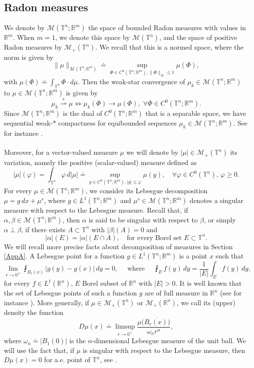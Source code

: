 \documentclass[10pt,reqno]{amsart}
\numberwithin{equation}{section}
\newcommand{\weak}{\overset{*}{\rightharpoonup}}
\newcommand{\R}{\mathbb{R}}
\newcommand{\T}{\mathbb{T}}
\theoremstyle{plain}
\theoremstyle{definition}
\theoremstyle{remark}
\begin{document}
\subsection{Radon measures}

We denote by $\mathcal{M}(\T^n;\R^m)$ the space of bounded Radon measures with values in $\R^m$. When $m =1$, we denote this space by $\mathcal{M}(\T^n)$, and the space of positive Radon measures by $\mathcal{M}_+(\T^n)$. We recall that this is a normed space, where the norm is given by
 $$\|\mu\|_{\mathcal{M}(\T^n;\R^m)} \doteq \sup_{\Phi \in C^0(\T^n;\R^m),\|\Phi\|_{\infty}\le 1}\mu(\Phi),
 $$
with $\mu(\Phi)\doteq \int_{\T^n} \Phi\cdot d\mu $. Then the weak-star convergence of $\mu_k \in \mathcal{M}(\T^n;\R^m)$ to $\mu \in \mathcal{M}(\T^n;\R^m)$ is given by
\[
\mu_k \weak \mu  \Leftrightarrow \mu_k(\Phi) \to \mu(\Phi), \, \, \forall \Phi \in C^0(\T^n;\R^m).
\]
Since $\mathcal{M}(\T^n;\R^m)$ is the dual of $C^0(\T^n;\R^m)$ that is a separable space, we have sequential weak-$*$ compactness for equibounded sequences $\mu_k \in \mathcal{M}(\T^n;\R^m)$. See for instance \cite[Sec. 1.9]{EVG}.
\\
\\
Moreover, for a vector-valued measure $\mu$ we will denote by $|\mu|\in \mathcal{M}_+(\T^n)$ its variation, namely the positive (scalar-valued) measure defined as
$$
|\mu|(\varphi)=\int_{\T^n} \varphi \,d|\mu| \doteq \sup_{g \in C^0(\T^n;\R^m),|g|\le \varphi}\mu(g),\quad \forall \varphi\in C^0(\T^n), \, \varphi \geq 0.
$$
For every $\mu \in \mathcal{M}(\T^n;\R^m)$, we consider its Lebesgue decomposition $\mu = g\,dx + \mu^s$, where $g \in L^1(\T^n;\R^m)$ and $\mu^s \in \mathcal{M}(\T^n;\R^m)$ denotes a singular measure with respect to the Lebesgue measure. Recall that, if $\alpha,\beta \in \mathcal{M}(\T^n;\R^m)$, then $\alpha$ is said to be singular with respect to $\beta$, or simply $\alpha \perp \beta$, if there exists $A \subset \T^n$ with $|\beta|(A) = 0$ and
\[
|\alpha|(E) = |\alpha|(E\cap A), \quad  \text{for every Borel set } E \subset \T^n.
\]
We will recall more precise facts about decomposition of measures in Section \ref{AppA}. A Lebesgue point for a function $g \in L^1(\T^n;\R^m)$ is a point $x$ such that
$$
\lim_{r\rightarrow 0^+}\fint_{B_r(x)}\left|g(y) - g(x)\right|\,dy=0, \quad \text{ where } \quad \fint_{E} f(y)\,dy = \frac{1}{|E|}\int_E f(y)\,dy,$$ for every $f \in L^1(\R^n)$, $ E$ Borel subset of $\R^n$  with $|E|>0$. It is well known that the set of Lebesgue points of such a function $g$ are of full measure in $\R^n$ (see for instance \cite[Theorem 1.33]{EVG}). More generally, if $\mu \in \mathcal{M}_+(\T^n)$ or $\mathcal{M}_+(\R^n)$, we call its (upper) density the function
\[
D\mu(x) \doteq \limsup_{r \to 0^+}\frac{\mu(\overline{B_r(x))}}{\omega_nr^n},
\]
where $\omega_n \doteq |B_1(0)|$ is the $n$-dimensional Lebesgue measure of the unit ball. We will use the fact that, if $\mu$ is singular with respect to the Lebesgue measure, then $D\mu(x) = 0$ for a.e. point of $\T^n$, see \cite[Thm. 1.31]{EVG}.
\end{document}
